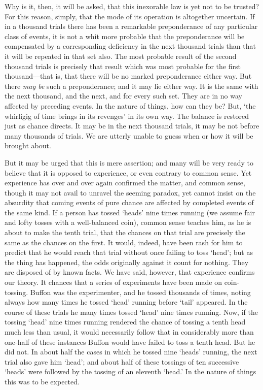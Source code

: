 \documentclass[letterpaper,12pt,oneside,openany]{memoir}
\begin{document}
Why is it, then, it will be asked, that this inexorable
law is yet not to be trusted? For this reason, simply,
that the mode of its operation is altogether uncertain.
If in a thousand trials there has been a remarkable
preponderance of any particular class of events, it is
not a whit more probable that the preponderance will
be compensated by a corresponding deficiency in the
next thousand trials than that it will be repeated in
that set also. The most probable result of the second
thousand trials is precisely that result which was most
probable for the first thousand---that is, that there will
be no marked preponderance either way. But there
\emph{may be} such a preponderance; and it may lie either
way. It is the same with the next thousand, and the
next, and for every such set. They are in no way
affected by preceding events. In the nature of things,
how can they be? But, `the whirligig of time brings
in its revenges' in its own way. The balance is restored
just as chance directs. It may be in the next thousand
trials, it may be not before many thousands of trials.
We are utterly unable to guess when or how it will be
brought about.

But it may be urged that this is mere assertion; and
many will be very ready to believe that it is opposed to
experience, or even contrary to common sense. Yet
experience has over and over again confirmed the
matter, and common sense, though it may not avail to
unravel the seeming paradox, yet cannot insist on the
absurdity that coming events of pure chance are affected
by completed events of the same kind. If a person
has tossed `heads' nine times running (we assume fair
and lofty tosses with a well-balanced coin), common
sense teaches him, as he is about to make the tenth
trial, that the chances on that trial are precisely the
same as the chances on the first. It would, indeed,
have been rash for him to predict that he would reach
that trial without once failing to toss `head'; but as
the thing has happened, the odds originally against it
count for nothing. They are disposed of by known
facts. We have said, however, that experience confirms
our theory. It chances that a series of experiments
have been made on coin-tossing. Buffon was
the experimenter, and he tossed thousands of times,
noting always how many times he tossed `head' running
before `tail' appeared. In the course of these
trials he many times tossed `head' nine times running.
Now, if the tossing `head' nine times running rendered
the chance of tossing a tenth head much less
than usual, it would necessarily follow that in considerably
more than one-half of these instances Buffon
would have failed to toss a tenth head. But he did
not. In about half the cases in which he tossed
nine `heads' running, the next trial also gave him
`head'; and about half of these tossings of ten
successive `heads' were followed by the tossing of an
eleventh `head.' In the nature of things this was to
be expected.
\end{document}
